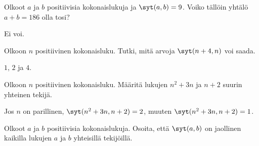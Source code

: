 \begin{tehtava}
    Olkoot $a$ ja $b$ positiivisia kokonaislukuja ja $\syt(a, b)=9$. Voiko tällöin yhtälö $a + b = 186$ olla tosi?
    
    \begin{vastaus}
        Ei voi.
    \end{vastaus}
    
\end{tehtava}

\begin{tehtava}
    Olkoon $n$ positiivinen kokonaisluku. Tutki, mitä arvoja $\syt(n+4, n)$ voi saada.
    
    \begin{vastaus}
        $1$, $2$ ja $4$.
    \end{vastaus}
    
\end{tehtava}

\begin{tehtava}
    Olkoon $n$ positiivinen kokonaisluku. Määritä lukujen $n^2 + 3n$ ja $n + 2$ suurin yhteinen tekijä.
    
    \begin{vastaus}
        Jos $n$ on parillinen, $\syt(n^2 + 3n, n + 2) = 2$, muuten $\syt(n^2 + 3n, n + 2) = 1$.
    \end{vastaus}
    
\end{tehtava}

\begin{tehtava}
    Olkoot $a$ ja $b$ positiivisia kokonaislukuja. Osoita, että $\syt(a, b)$ on jaollinen kaikilla lukujen $a$ ja $b$ yhteisillä tekijöillä.
\end{tehtava}

